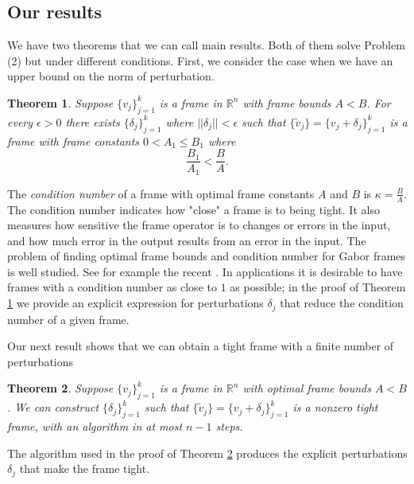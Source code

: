 \documentclass[11pt, reqno]{amsart}
\providecommand{\wt}{\widetilde}
\providecommand{\R}{\mathbb R}
\newtheorem{theorem}{Theorem}[section]
\numberwithin{equation}{section}
\begin{document}
 

\subsection{Our results} 

 
We have two theorems that we can call main results. Both of them solve Problem (2) but under different conditions. First, we consider the case when we have an upper bound on the norm of perturbation. 
 
\begin{theorem}\label{thm: betterFrame}
    Suppose $\{v_j\}_{j=1}^k$ is a frame in $\R^n$ with frame bounds $A<B$. For every $\epsilon >0$  there exists $\{\delta_j\}_{j=1}^k$ where  $||\delta_j||<\epsilon$ such that $\{\wt{v}_j\}=\{v_j+\delta_j\}_{j=1}^k$ is a frame with frame constants $0<A_1\le B_1$ where $$\frac{B_1}{A_1}<\frac{B}{A}.$$ 
\end{theorem}



	
	The {\it condition number} of a frame with optimal frame constants $A$ and $B$ is $\kappa= \frac BA$. The condition number indicates how "close" a frame is to being tight.  It also measures how sensitive the frame operator is to changes or errors in the input, and how much error in the output results from an error in the input. The problem of finding optimal  frame bounds and condition number for Gabor frames is  well studied. See for example the recent  \cite{Faulhuber2018,FS2023}. In applications it is desirable to have frames with a condition number as close to $1$ as possible; in the proof of Theorem \ref{thm: betterFrame} we provide an explicit expression for perturbations $\delta_j$ that reduce the condition number of a  given frame.     


  
  
  Our next result shows that 
we can obtain a tight frame with a finite number of   perturbations 
\begin{theorem}\label{thm: tightAlg}
    Suppose $\{v_j\}_{j=1}^k$ is a  frame in $\R^n$ with optimal frame bounds $A< B$. We can construct $\{\delta_j\}_{j=1}^k$ such that $\{\wt{v}_j\}=\{v_j+\delta_j\}_{j=1}^k$ is a nonzero  tight frame, with an algorithm in at most $n-1$ steps.
\end{theorem}
 
 
 
  The algorithm used in the proof of Theorem \ref{thm: tightAlg} produces the explicit perturbations $\delta_j$   that make the frame tight.
\end{document}
